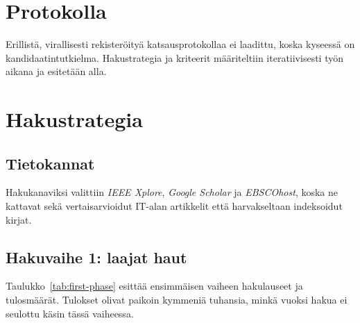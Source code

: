 \documentclass[bscthesis,finnish,oneside,biblatex]{uefcsthesis}
\begin{document}
\section{Protokolla}
\label{sec:protocol}

Erillistä, virallisesti rekisteröityä katsausprotokollaa ei laadittu,
koska kyseessä on kandidaatintutkielma. Hakustrategia ja kriteerit
määriteltiin iteratiivisesti työn aikana ja esitetään alla.


\section{Hakustrategia}
\label{sec:search-strategy}

\subsection{Tietokannat}
Hakukanaviksi valittiin \emph{IEEE Xplore}, \emph{Google Scholar}
ja \emph{EBSCOhost}, koska ne kattavat sekä vertaisarvioidut
IT-alan artikkelit että harvakseltaan indeksoidut kirjat.

\subsection{Hakuvaihe 1: laajat haut}
Taulukko~\ref{tab:first-phase} esittää ensimmäisen vaiheen
hakulauseet ja tulosmäärät. Tulokset olivat paikoin kymmeniä tuhansia,
minkä vuoksi hakua ei seulottu käsin tässä vaiheessa.
\end{document}
